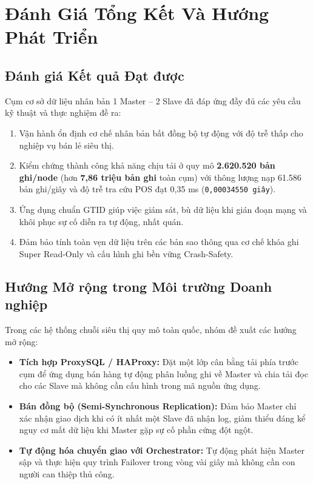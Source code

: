 \documentclass[12pt,a4paper]{report}
\begin{document}
\chapter{Đánh Giá Tổng Kết Và Hướng Phát Triển}

\section{Đánh giá Kết quả Đạt được}
Cụm cơ sở dữ liệu nhân bản 1 Master -- 2 Slave đã đáp ứng đầy đủ các yêu cầu kỹ thuật và thực nghiệm đề ra:
\begin{enumerate}
    \item Vận hành ổn định cơ chế nhân bản bất đồng bộ tự động với độ trễ thấp cho nghiệp vụ bán lẻ siêu thị.
    \item Kiểm chứng thành công khả năng chịu tải ở quy mô \textbf{2.620.520 bản ghi/node} (hơn \textbf{7,86 triệu bản ghi} toàn cụm) với thông lượng nạp 61.586 bản ghi/giây và độ trễ tra cứu POS đạt 0,35 ms (\texttt{0,00034550 giây}).
    \item Ứng dụng chuẩn GTID giúp việc giám sát, bù dữ liệu khi gián đoạn mạng và khôi phục sự cố diễn ra tự động, nhất quán.
    \item Đảm bảo tính toàn vẹn dữ liệu trên các bản sao thông qua cơ chế khóa ghi Super Read-Only và cấu hình ghi bền vững Crash-Safety.
\end{enumerate}

\section{Hướng Mở rộng trong Môi trường Doanh nghiệp}
Trong các hệ thống chuỗi siêu thị quy mô toàn quốc, nhóm đề xuất các hướng mở rộng:
\begin{itemize}
    \item \textbf{Tích hợp ProxySQL / HAProxy:} Đặt một lớp cân bằng tải phía trước cụm để ứng dụng bán hàng tự động phân luồng ghi về Master và chia tải đọc cho các Slave mà không cần cấu hình trong mã nguồn ứng dụng.
    \item \textbf{Bán đồng bộ (Semi-Synchronous Replication):} Đảm bảo Master chỉ xác nhận giao dịch khi có ít nhất một Slave đã nhận log, giảm thiểu đáng kể nguy cơ mất dữ liệu khi Master gặp sự cố phần cứng đột ngột.
    \item \textbf{Tự động hóa chuyển giao với Orchestrator:} Tự động phát hiện Master sập và thực hiện quy trình Failover trong vòng vài giây mà không cần con người can thiệp thủ công.
\end{itemize}
\end{document}
